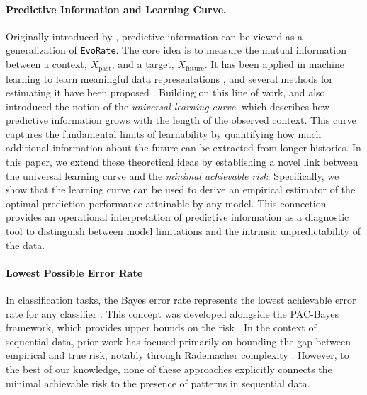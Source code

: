 \documentclass{article}
\begin{document}
\paragraph{Predictive Information and Learning Curve.}
Originally introduced by \cite{bialek1999predictive, bialek2001predictability}, predictive information can be viewed as a generalization of \texttt{EvoRate}. The core idea is to measure the mutual information between a context, $X_{\text{past}}$, and a target, $X_{\text{future}}$. It has been applied in machine learning to learn meaningful data representations \cite{lee2020predictive}, and several methods for estimating it have been proposed \cite{fischer2020conditional}.
Building on this line of work, \cite{bialek1999predictive} and \cite{crutchfield2003regularities} also introduced the notion of the \emph{universal learning curve}, which describes how predictive information grows with the length of the observed context. This curve captures the fundamental limits of learnability by quantifying how much additional information about the future can be extracted from longer histories.
In this paper, we extend these theoretical ideas by establishing a novel link between the universal learning curve and the \emph{minimal achievable risk}. Specifically, we show that the learning curve can be used to derive an empirical estimator of the optimal prediction performance attainable by any model. This connection provides an operational interpretation of predictive information as a diagnostic tool to distinguish between model limitations and the intrinsic unpredictability of the data.

\paragraph{Lowest Possible Error Rate}
In classification tasks, the Bayes error rate represents the lowest achievable error rate for any classifier \cite{tumer1996estimating, chen2023evaluating, tumer2003bayes}. This concept was developed alongside the PAC-Bayes framework, which provides upper bounds on the risk \cite{rivasplata2019pac, langford2001bounds}. In the context of sequential data, prior work has focused primarily on bounding the gap between empirical and true risk, notably through Rademacher complexity \cite{mohri2008rademacher, mcdonald2011rademacher, kuznetsov2015learning}. However, to the best of our knowledge, none of these approaches explicitly connects the minimal achievable risk to the presence of patterns in sequential data.
\end{document}
